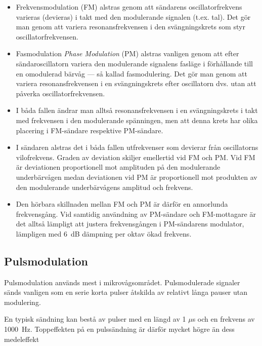 \begin{itemize}
\item Frekvensmodulation (FM) alstras genom att sändarens oscillatorfrekvens
  varieras (devieras) i takt med den modulerande signalen (t.ex. tal).
  Det gör man genom att variera resonansfrekvensen i den svängningskrets som
  styr oscillatorfrekvensen.

\item Fasmodulation \emph{Phase Modulation} (PM) alstras vanligen genom att efter sändaroscillatorn
  variera den modulerande signalens fasläge i förhållande till en omodulerad
  bärvåg --- så kallad fasmodulering.
  Det gör man genom att variera resonansfrekvensen i en svängningskrets efter
  oscillatorn dvs. utan att påverka oscillatorfrekvensen.

\item I båda fallen ändrar man alltså resonansfrekvensen i en svängningskrets i
  takt med frekvensen i den modulerande spänningen, men att denna krets har
  olika placering i FM-sändare respektive PM-sändare.

\item I sändaren alstras det i båda fallen utfrekvenser som devierar från
  oscillatorns vilofrekvens.
  Graden av deviation skiljer emellertid vid FM och PM.
  Vid FM är deviationen proportionell mot amplituden på den modulerande
  underbärvågen medan deviationen vid PM är proportionell mot produkten av den
  modulerande underbärvågens amplitud och frekvens.

\item Den hörbara skillnaden mellan FM och PM är därför en annorlunda
  frekvensgång.
  Vid samtidig användning av PM-sändare och FM-mottagare är det alltså lämpligt
  att justera frekvensgången i PM-sändarens modulator, lämpligen
  med 6~dB dämpning per oktav ökad frekvens.
\end{itemize}

\subsection{Pulsmodulation}

Pulsmodulation används mest i mikrovågsområdet.
Pulsmodulerade signaler sänds vanligen som en serie korta pulser åtskilda av
relativt långa pauser utan modulering.

En typisk sändning kan bestå av pulser med en längd av 1 \(\mu\)s och en
frekvens av 1000~Hz.
Toppeffekten på en pulssändning är därför mycket högre än dess medeleffekt

